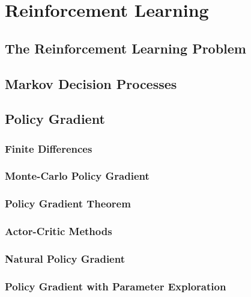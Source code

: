 \chapter{Reinforcement Learning}

\section{The Reinforcement Learning Problem}

\section{Markov Decision Processes}

\section{Policy Gradient}

\subsection{Finite Differences}

\subsection{Monte-Carlo Policy Gradient}

\subsection{Policy Gradient Theorem}

\subsection{Actor-Critic Methods}

\subsection{Natural Policy Gradient}

\subsection{Policy Gradient with Parameter Exploration}
